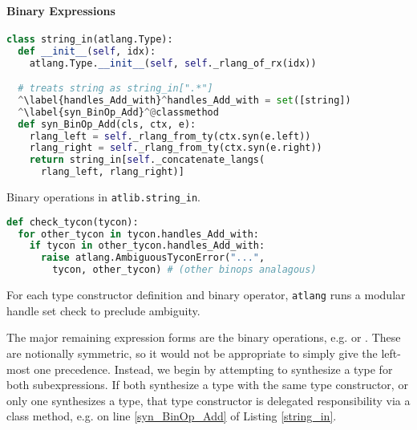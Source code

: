 \paragraph{Binary Expressions} \begin{codelisting}[t]
\begin{lstlisting}[language=Python]
class string_in(atlang.Type):
  def __init__(self, idx):
    atlang.Type.__init__(self, self._rlang_of_rx(idx))

  # treats string as string_in[".*"]
  ^\label{handles_Add_with}^handles_Add_with = set([string]) 
  ^\label{syn_BinOp_Add}^@classmethod
  def syn_BinOp_Add(cls, ctx, e): 
    rlang_left = self._rlang_from_ty(ctx.syn(e.left)) 
    rlang_right = self._rlang_from_ty(ctx.syn(e.right))
    return string_in[self._concatenate_langs(
      rlang_left, rlang_right)]
\end{lstlisting}
\caption{Binary operations in \texttt{atlib.string\_in}.}
\label{string_in}
\end{codelisting}
\begin{codelisting}[t]
\begin{lstlisting}[language=Python]
def check_tycon(tycon):
  for other_tycon in tycon.handles_Add_with: 
    if tycon in other_tycon.handles_Add_with:
      raise atlang.AmbiguousTyconError("...", 
        tycon, other_tycon) # (other binops analagous)
\end{lstlisting}
\caption{For each type constructor definition and binary operator, \texttt{atlang} runs a modular handle set check to preclude ambiguity.}
\label{check_tycon}
\end{codelisting}
The major remaining expression forms are the binary operations, e.g.  or . These are notionally symmetric, so it would not be appropriate to simply give the left-most one precedence. Instead, we begin by attempting to synthesize a type for both subexpressions. If both synthesize a type with the same type constructor, or only one synthesizes a type, that type constructor is delegated responsibility via a class method, e.g.  on line \ref{syn_BinOp_Add} of Listing \ref{string_in}. 

